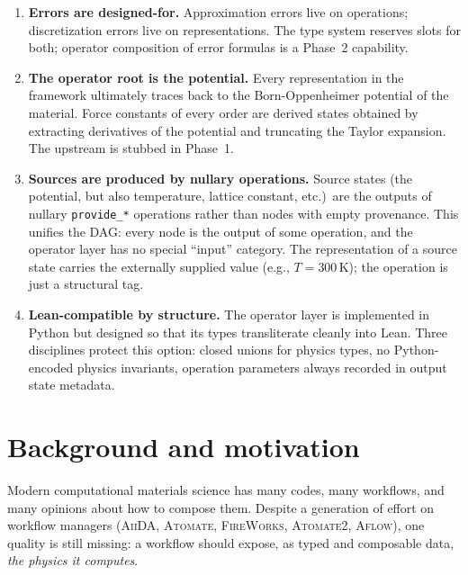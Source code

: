 \documentclass[11pt,a4paper]{article}
\begin{document}
\begin{enumerate}[leftmargin=2.5em, itemsep=0.4em]
  \item \textbf{Errors are designed-for.} Approximation errors live on operations;
        discretization errors live on representations. The type system reserves slots
        for both; operator composition of error formulas is a Phase~2 capability.

  \item \textbf{The operator root is the potential.} Every representation in the framework
        ultimately traces back to the Born-Oppenheimer potential of the material. Force
        constants of every order are derived states obtained by extracting derivatives of
        the potential and truncating the Taylor expansion. The upstream is stubbed in
        Phase~1.

  \item \textbf{Sources are produced by nullary operations.} Source states (the
        potential, but also temperature, lattice constant, etc.)\ are the outputs of
        nullary \texttt{provide\_*} operations rather than nodes with empty provenance.
        This unifies the DAG: every node is the output of some operation, and the
        operator layer has no special ``input'' category. The representation of a source
        state carries the externally supplied value (e.g., $T = 300\,\mathrm{K}$); the
        operation is just a structural tag.

  \item \textbf{Lean-compatible by structure.} The operator layer is implemented in Python
        but designed so that its types transliterate cleanly into Lean. Three disciplines
        protect this option: closed unions for physics types, no Python-encoded physics
        invariants, operation parameters always recorded in output state metadata.
       
\end{enumerate}

\bigskip


\section{Background and motivation}
\label{sec:motivation}

Modern computational materials science has many codes, many workflows, and many opinions about how
to compose them. Despite a generation of effort on workflow managers (\textsc{AiiDA}, \textsc{Atomate},
\textsc{FireWorks}, \textsc{Atomate2}, \textsc{Aflow}), one quality is still missing: a workflow
should expose, as typed and composable data, \emph{the physics it computes}.
\end{document}

